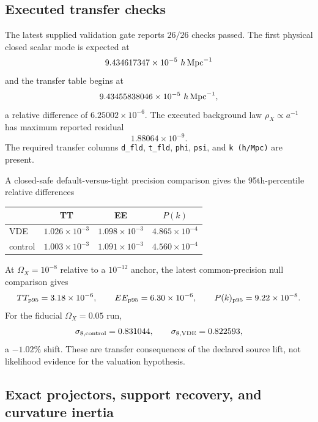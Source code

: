 \documentclass[aps,prd,preprint,onecolumn,nofootinbib,superscriptaddress,showkeys]{revtex4-2}
\numberwithin{equation}{section}
\theoremstyle{definition}
\theoremstyle{plain}
\begin{document}
\subsection{Executed transfer checks}

The latest supplied validation gate reports \(26/26\) checks passed.  The first physical closed scalar mode is expected at
\begin{equation}
9.434617347\times10^{-5}\ h\,{\rm Mpc}^{-1}
\end{equation}
and the transfer table begins at
\begin{equation}
9.43455838046\times10^{-5}\ h\,{\rm Mpc}^{-1},
\end{equation}
a relative difference of \(6.25002\times10^{-6}\).  The executed background law \(\rho_X\propto a^{-1}\) has maximum reported residual
\begin{equation}
\boxed{1.88064\times10^{-9}}.
\end{equation}
The required transfer columns \texttt{d\_fld}, \texttt{t\_fld}, \texttt{phi}, \texttt{psi}, and \texttt{k (h/Mpc)} are present.

A closed-safe default-versus-tight precision comparison gives the 95th-percentile relative differences
\begin{center}
\begin{tabular}{@{}lccc@{}}
\toprule
 & TT & EE & \(P(k)\) \\
\midrule
VDE & \(1.026\times10^{-3}\) & \(1.098\times10^{-3}\) & \(4.865\times10^{-4}\) \\
control & \(1.003\times10^{-3}\) & \(1.091\times10^{-3}\) & \(4.560\times10^{-4}\) \\
\bottomrule
\end{tabular}
\end{center}
At \(\Omega_X=10^{-8}\) relative to a \(10^{-12}\) anchor, the latest common-precision null comparison gives
\begin{equation}
TT_{\rm p95}=3.18\times10^{-6},\qquad
EE_{\rm p95}=6.30\times10^{-6},\qquad
P(k)_{\rm p95}=9.22\times10^{-8}.
\end{equation}
For the fiducial \(\Omega_X=0.05\) run,
\begin{equation}
\sigma_{8,{\rm control}}=0.831044,
\qquad
\sigma_{8,{\rm VDE}}=0.822593,
\end{equation}
a \(-1.02\%\) shift.  These are transfer consequences of the declared source lift, not likelihood evidence for the valuation hypothesis.

\subsection{Exact projectors, support recovery, and curvature inertia}
\end{document}
